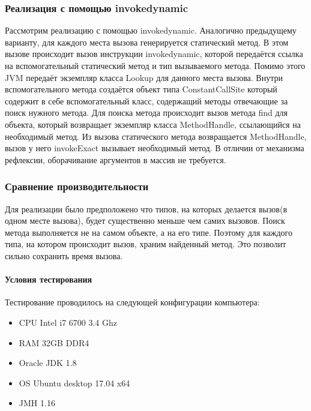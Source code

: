 \subsubsection{Реализация с помощью invokedynamic}
Рассмотрим реализацию с помощью invokedynamic. Аналогично предыдущему варианту, для каждого места вызова генерируется статический метод. В этом вызове происходит вызов инструкции invokedynamic, которой передаётся ссылка на вспомогательный статический метод и тип вызываемого метода. Помимо этого JVM передаёт экземпляр класса Lookup для данного места вызова. Внутри вспомогательного метода создаётся объект типа ConstantCallSite который содержит в себе вспомогательный класс, содержащий методы отвечающие за поиск нужного метода. Для поиска метода происходит вызов метода find для объекта, который возвращает экземпляр класса MethodHandle, ссылающийся на необходимый метод. Из вызова статического метода возвращается MethodHandle, вызов у него invokeExact вызывает необходимый метод. В отличии от механизма рефлексии, оборачивание аргументов в массив не требуется.

\subsubsection{Сравнение производительности}
Для реализации было предположено что типов, на которых делается вызов(в одном месте вызова), будет существенно меньше чем самих вызовов. Поиск метода выполняется не на самом объекте, а на его типе. Поэтому для каждого типа, на котором происходит вызов, храним найденный метод. Это позволит сильно сохранить время вызова.

\paragraph{Условия тестирования}
Тестирование проводилось на следующей конфигурации компьютера:
\begin{itemize}
    \item CPU Intel i7 6700 3.4 Ghz
    \item RAM 32GB DDR4
    \item Oracle JDK 1.8
    \item OS Ubuntu desktop 17.04 x64
    \item JMH 1.16
\end{itemize}

